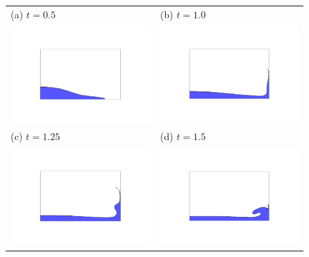 \begin{figure}[tbp]
\begin{center}
\begin{tabular}{ll}
(a) $t = 0.5$ & (b) $t = 1.0$   \\
\includegraphics[width=7cm, trim=8.0cm 6.5cm 8.0cm 6.5cm, clip=true]{examples_images/water_collapse/water_collapse_100.png} & \includegraphics[width=7cm, trim=8.0cm 6.5cm 8.0cm 6.5cm, clip=true]{examples_images/water_collapse/water_collapse_200.png} \\
(c) $t = 1.25$ & (d) $t = 1.5$ \\
\includegraphics[width=7cm, trim=8.0cm 6.5cm 8.0cm 6.5cm, clip=true]{examples_images/water_collapse/water_collapse_250.png} & \includegraphics[width=7cm, trim=8.0cm 6.5cm 8.0cm 6.5cm, clip=true]{examples_images/water_collapse/water_collapse_300.png} \\

\end{tabular}
\end{center}
\end{figure}
